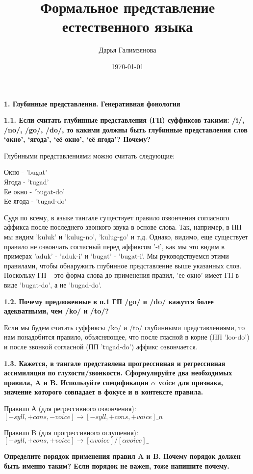 \documentclass[a4paper,12pt]{article}
\author{Дарья Галимзянова}
\title{Формальное представление естественного языка}
\date{\today}
\begin{document}
\maketitle
\textbf{1. Глубинные представления. Генеративная фонология}

\textbf{1.1. Если считать глубинные представления (ГП) суффиксов такими: /i/, /no/, /go/,
/do/, то какими должны быть глубинные представления слов ‘окно’, ‘ягода’, ‘её
окно’, ‘её ягода’? Почему?}


Глубнными представлениями можно считать следующие:

Окно - 'bugat'\\
Ягода - 'tugad'\\
Ее окно - 'bugat-do'\\
Ее ягода - 'tugad-do'

Судя по всему, в языке тангале существует правило озвончения согласного аффикса после последнего звонкого звука в основе слова. Так, например, в ПП мы видим 'kuluk' и 'kulug-no', 'kulug-go' и т.д. Однако, видимо, еще существует правило не озвончать согласный перед аффиксом '-i', как мы это видим в примерах 'aduk' - 'aduk-i' и 'bugat' - 'bugat-i'. Мы руководствуемся этими правилами, чтобы обнаружить глубинное представление выше указанных слов. Поскольку ГП -- это форма слова до применения правил, 'ее окно' имеет ГП в виде 'bugat-do', а не 'bugad-do'.

\textbf{1.2. Почему предложенные в п.1 ГП /go/ и /do/ кажутся более адекватными, чем /ko/
и /to/?}

Если мы будем считать суффиксы /ko/ и /to/ глубинными представлениями, то нам понадобится правило, объясняющее, что после гласной в корне (ПП 'loo-do') и после звонкой согласной (ПП 'tugad-do') аффикс озвончается.

\textbf{1.3. Кажется, в тангале представлена прогрессивная и регрессивная ассимиляция по
глухости/звонкости. Сформулируйте два необходимых правила, A и B. Используйте
спецификации $\alpha$ voice для признака, значение которого совпадает в фокусе и в
контексте правила.}

Правило А (для регрессивного озвончения):\\
$[-syll, +cons, -voice] \rightarrow [-syll, +cons, +voice] \_n\ $

Правило B (для прогрессивного оглушения):\\
$[-syll, +cons, +voice] ️\rightarrow [\alpha voice]/[\alpha voice]\_$

\textbf{Определите порядок применения правил A и B. Почему порядок должен быть
именно таким? Если порядок не важен, тоже напишите почему.}
\end{document}
